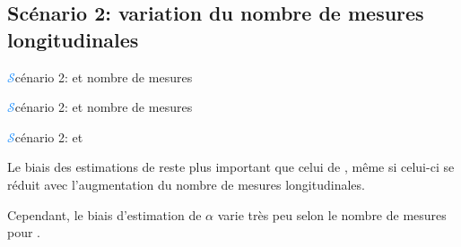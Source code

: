\subsection{Scénario 2: variation du nombre de mesures longitudinales}
\begin{frame}{{\huge\textcolor{dodgerblue}{$\mathcal{S}$}}cénario 2:  et nombre de mesures}
\begin{center}
\end{center}
\end{frame}
\begin{frame}{{\huge\textcolor{dodgerblue}{$\mathcal{S}$}}cénario 2:  et nombre de mesures}
\begin{center}
\end{center}
\end{frame}
\begin{frame}{{\huge\textcolor{dodgerblue}{$\mathcal{S}$}}cénario 2:  et }
\par{Le biais des estimations de  reste plus important que celui de ,
même si celui-ci se réduit avec l'augmentation du nombre de mesures longitudinales.}
\vspace{1em}
\par{Cependant, le biais d'estimation de \textcolor{springgreen3}{$\alpha$} varie très peu selon le nombre de mesures pour .}
\end{frame}



